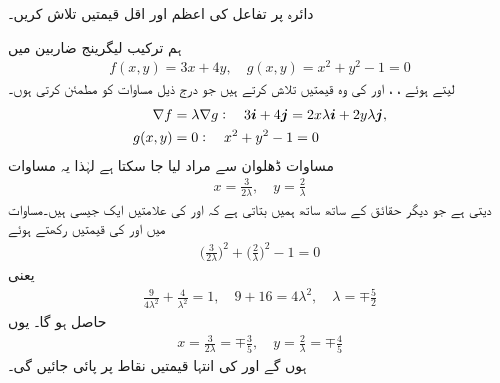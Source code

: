 دائرہ  پر تفاعل  کی اعظم اور اقل قیمتیں تلاش کریں۔

ہم ترکیب لیگرینج ضاربین  میں
\begin{align*}
f(x,y)=3x+4y,\quad g(x,y)=x^2+y^2-1=0
\end{align*} 
لیتے ہوئے ،  ، اور  کی وہ قیمتیں تلاش کرتے ہیں جو  درج ذیل  مساوات کو مطمئن کرتی ہوں۔
\begin{align*}
\nabla f&=\lambda \nabla g:\quad 3{\boldsymbol{i}}+4{\boldsymbol{j}}=2x\lambda{\boldsymbol{i}}+2y\lambda {\boldsymbol{j}},\\
g(x,y)&=0:\quad x^2+y^2-1=0
\end{align*}
مساوات ڈھلوان سے مراد  لیا جا سکتا ہے لہٰذا یہ مساوات
\begin{align*}
x=\frac{3}{2\lambda},\quad y=\frac{2}{\lambda}
\end{align*}
دیتی ہے  جو  دیگر حقائق کے ساتھ ساتھ ہمیں بتاتی ہے  کہ  اور  کی علامتیں ایک   جیسی ہیں۔مساوات  میں  اور  کی  قیمتیں  رکھتے  ہوئے
\begin{align*}
\big(\frac{3}{2\lambda}\big)^2+\big(\frac{2}{\lambda}\big)^2-1=0
\end{align*}
یعنی
\begin{align*}
\frac{9}{4\lambda^2}+\frac{4}{\lambda^2}=1,\quad 9+16=4\lambda^2,\quad \lambda=\mp\frac{5}{2}
\end{align*}
حاصل ہو گا۔ یوں 
\begin{align*}
x=\frac{3}{2\lambda}=\mp\frac{3}{5},\quad y=\frac{2}{\lambda}=\mp\frac{4}{5}
\end{align*}
ہوں گے اور  کی انتہا  قیمتیں نقاط  پر پائی جائیں گی۔

